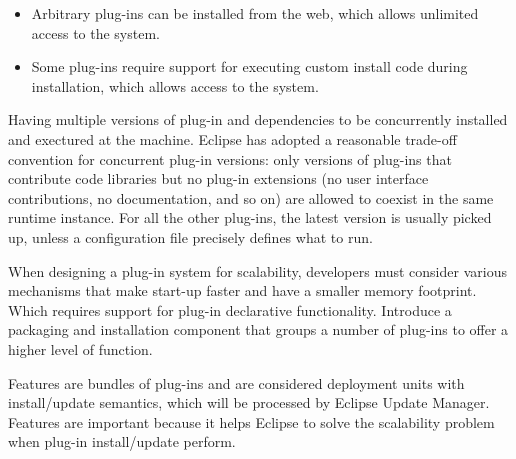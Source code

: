 \documentclass[12pt,letterpaper,boxed]{hmcpset}
\begin{document}
\begin{problem}
\end{problem}

\begin{itemize}
\item Arbitrary plug-ins can be installed from the web, which allows unlimited access to the system.
\item Some plug-ins require support for executing custom install code during installation, which allows access to the system.

\end{itemize}

\begin{problem}
\end{problem}

Having multiple versions of plug-in and dependencies to be concurrently installed and exectured at the machine.\newline
\indent
Eclipse has adopted a reasonable trade-off convention for concurrent plug-in versions: only versions of plug-ins that contribute code libraries but no plug-in extensions (no user interface contributions, no documentation, and so on) are allowed to coexist in the same runtime instance. For all the other plug-ins, the latest version is usually picked up, unless a configuration file precisely defines what to run.
\newline

\begin{problem}
\end{problem}

When designing a plug-in system for scalability, developers must consider various mechanisms that make start-up faster and have a smaller memory footprint. Which requires support for plug-in declarative functionality.\newline
\indent
Introduce a packaging and installation component that groups a number of plug-ins to offer a higher level of function.
\newline
\begin{problem}
\end{problem}

Features are bundles of plug-ins and are considered deployment units with install/update semantics, which will be processed by Eclipse Update Manager.\newline
\indent
Features are important because it helps Eclipse to solve the scalability problem when plug-in install/update perform.
\end{document}
